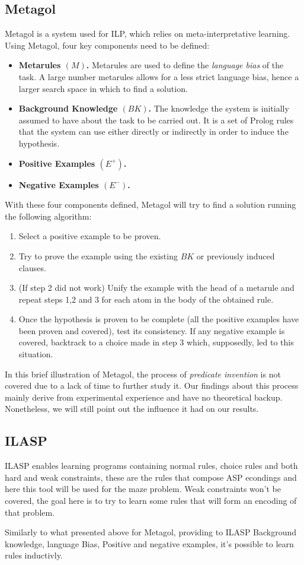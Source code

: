 \subsection{Metagol}
Metagol is a system used for ILP, which relies on meta-interpretative learning.\\
Using Metagol, four key components need to be defined:
\begin{itemize}
    \item \textbf{Metarules \((M)\).} Metarules are used to define the \emph{language bias} of the task. A large number metarules allows for a less strict language bias, hence a larger search space in which to find a solution. 
    \item \textbf{Background Knowledge \((BK)\).} The knowledge the system is initially assumed to have about the task to be carried out. It is a set of Prolog rules that the system can use either directly or indirectly in order to induce the hypothesis.
    \item \textbf{Positive Examples \((E^+)\).}
    \item \textbf{Negative Examples \((E^-)\).}
\end{itemize}
With these four components defined, Metagol will try to find a solution running the following algorithm:
\begin{enumerate}
    \item Select a positive example to be proven.
    \item Try to prove the example using the existing \(BK\) or previously induced clauses.
    \item (If step 2 did not work) Unify the example with the head of a metarule and repeat steps 1,2 and 3 for each atom in the body of the obtained rule.
    \item Once the hypothesis is proven to be complete (all the positive examples have been proven and covered), test its consistency. If any negative example is covered, backtrack to a choice made in step 3 which, supposedly, led to this situation.
\end{enumerate}
In this brief illustration of Metagol, the process of \emph{predicate invention} is not covered due to a lack of time to further study it. Our findings about this process mainly derive
from experimental experience and have no theoretical backup. Nonetheless, we will still point out the influence it had on our results.


\subsection{ILASP}

ILASP enables learning programs containing normal rules, choice rules and both hard and weak constraints, these are the rules that compose ASP econdings and here this tool will be used for the maze problem. Weak constraints won't be covered, the goal here is to try to learn some rules that will form an encoding of that problem.

Similarly to what presented above for Metagol, providing to ILASP Background knowledge, language Bias, Positive and negative examples, it's possible to learn rules inductivly.


